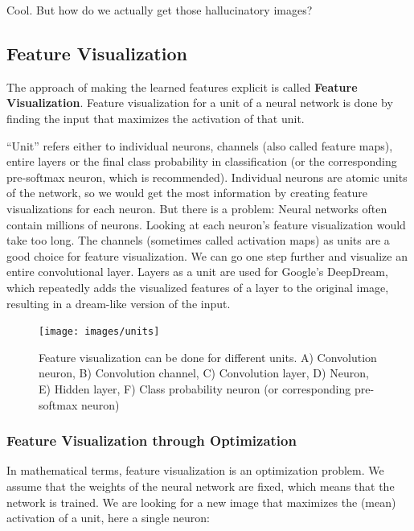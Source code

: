 \documentclass[12pt,]{krantz}
\begin{document}
Cool. But how do we actually get those hallucinatory images?

\hypertarget{feature-visualization}{\subsection{Feature
Visualization}\label{feature-visualization}}

The approach of making the learned features explicit is called
\textbf{Feature Visualization}. Feature visualization for a unit of a
neural network is done by finding the input that maximizes the
activation of that unit.

``Unit'' refers either to individual neurons, channels (also called
feature maps), entire layers or the final class probability in
classification (or the corresponding pre-softmax neuron, which is
recommended). Individual neurons are atomic units of the network, so we
would get the most information by creating feature visualizations for
each neuron. But there is a problem: Neural networks often contain
millions of neurons. Looking at each neuron's feature visualization
would take too long. The channels (sometimes called activation maps) as
units are a good choice for feature visualization. We can go one step
further and visualize an entire convolutional layer. Layers as a unit
are used for Google's DeepDream, which repeatedly adds the visualized
features of a layer to the original image, resulting in a dream-like
version of the input.

\begin{figure}

{\centering \texttt{[image: images/units]} 

}

\caption{Feature visualization can be done for different units. A) Convolution neuron, B) Convolution channel, C) Convolution layer, D) Neuron, E) Hidden layer, F) Class probability neuron (or corresponding pre-softmax neuron)}\label{fig:units}
\end{figure}

\subsubsection{Feature Visualization through
Optimization}\label{feature-visualization-through-optimization}

In mathematical terms, feature visualization is an optimization problem.
We assume that the weights of the neural network are fixed, which means
that the network is trained. We are looking for a new image that
maximizes the (mean) activation of a unit, here a single neuron:
\end{document}
